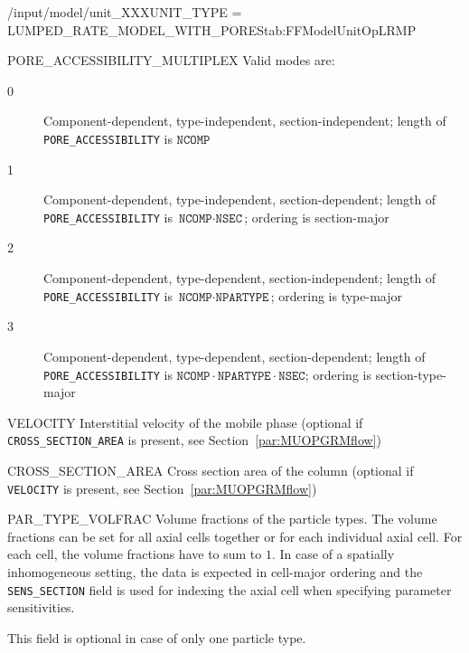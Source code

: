 \begin{condsubgroup}{/input/model/unit\_XXX}{UNIT\_TYPE = LUMPED\_RATE\_MODEL\_WITH\_PORES}{tab:FFModelUnitOpLRMP}
\begin{dataset}[unit=--,type=int,range={$\{0, \dots, 3 \}$},length={1}]{PORE\_ACCESSIBILITY\_MULTIPLEX}
    Valid modes are:
    \begin{description}
      \item[0] Component-dependent, type-independent, section-independent; length of \texttt{PORE\_ACCESSIBILITY} is $\texttt{NCOMP}$
      \item[1] Component-dependent, type-independent, section-dependent; length of \texttt{PORE\_ACCESSIBILITY} is $\texttt{NCOMP} \cdot \texttt{NSEC}$; ordering is section-major
      \item[2] Component-dependent, type-dependent, section-independent; length of \texttt{PORE\_ACCESSIBILITY} is $\texttt{NCOMP} \cdot \texttt{NPARTYPE}$; ordering is type-major
      \item[3] Component-dependent, type-dependent, section-dependent; length of \texttt{PORE\_ACCESSIBILITY} is $\texttt{NCOMP} \cdot \texttt{NPARTYPE} \cdot \texttt{NSEC}$; ordering is section-type-major
    \end{description}\vspace{-\baselineskip}
  \end{dataset}
  \begin{dataset}[unit=\si{\metre\per\second},type=double,range={$\mathds{R}$},length={$1$ / \texttt{NSEC}}]{VELOCITY}
    Interstitial velocity of the mobile phase (optional if \texttt{CROSS\_SECTION\_AREA} is present, see Section~\ref{par:MUOPGRMflow})
  \end{dataset}
  \begin{dataset}[unit=\si{\square\metre},type=double,range={$>0$},length={1}]{CROSS\_SECTION\_AREA}
    Cross section area of the column (optional if \texttt{VELOCITY} is present, see Section~\ref{par:MUOPGRMflow})
  \end{dataset}
  \begin{dataset}[unit=--,type=double,range={$[0,1]$},length={\texttt{NPARTYPE} / $\texttt{NCOL} \cdot \texttt{NPARTYPE}$}]{PAR\_TYPE\_VOLFRAC}
    Volume fractions of the particle types.
    The volume fractions can be set for all axial cells together or for each individual axial cell.
    For each cell, the volume fractions have to sum to $1$.
    In case of a spatially inhomogeneous setting, the data is expected in cell-major ordering and the \texttt{SENS\_SECTION} field is used for indexing the axial cell when specifying parameter sensitivities.

    This field is optional in case of only one particle type.
  \end{dataset}
\end{condsubgroup}

